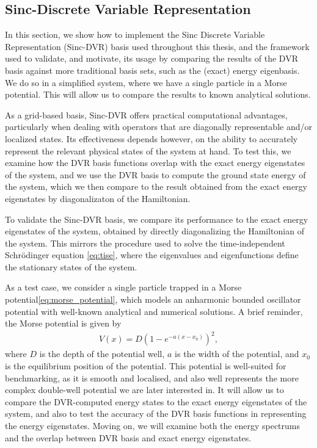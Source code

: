 \documentclass{subfiles}
\begin{document}
\subsection{Sinc-Discrete Variable Representation}\label{sec:sinc_dvr_validation}
In this section, we show how to implement the Sinc Discrete Variable Representation (Sinc-DVR) basis used throughout this thesis, and the framework used to validate, and motivate, its usage by comparing the results of the DVR basis against more traditional basis sets, such as the (exact) energy eigenbasis. We do so in a simplified system, where we have a single particle in a Morse potential. This will allow us to compare the results to known analytical solutions. 

As a grid-based basis, Sinc-DVR offers practical computational advantages, particularly when dealing with operators that are diagonally representable and/or localized states. Its effectiveness depends however, on the ability to accurately represent the relevant physical states of the system at hand. To test this, we examine how the DVR basis functions overlap with the exact energy eigenstates of the system, and we use the DVR basis to compute the ground state energy of the system, which we then compare to the result obtained from the exact energy eigenstates by diagonalizaton of the Hamiltonian. 

To validate the Sinc-DVR basis, we compare its performance to the exact energy eigenstates of the system, obtained by directly diagonalizing the Hamiltonian of the system. This mirrors the procedure used to solve the time-independent Schrödinger equation \eqref{eq:tise}, where the eigenvalues and eigenfunctions define the stationary states of the system.

As a test case, we consider a single particle trapped in a Morse potential\eqref{eq:morse_potential}, which models an anharmonic bounded oscillator potential with well-known analytical and numerical solutions. A brief reminder, the Morse potential is given by
\begin{align*}
    V(x) = D \left(1 - e^{-a(x - x_0)}\right)^2,
\end{align*}
where $D$ is the depth of the potential well, $a$ is the width of the potential, and $x_0$ is the equilibrium position of the potential. This potential is well-suited for benchmarking, as it is smooth and localised, and also well represents the more complex double-well potential we are later interested in. It will allow us to compare the DVR-computed energy states to the exact energy eigenstates of the system, and also to test the accuracy of the DVR basis functions in representing the energy eigenstates. Moving on, we will examine both the energy spectrums and the overlap between DVR basis and exact energy eigenstates. 
\end{document}
